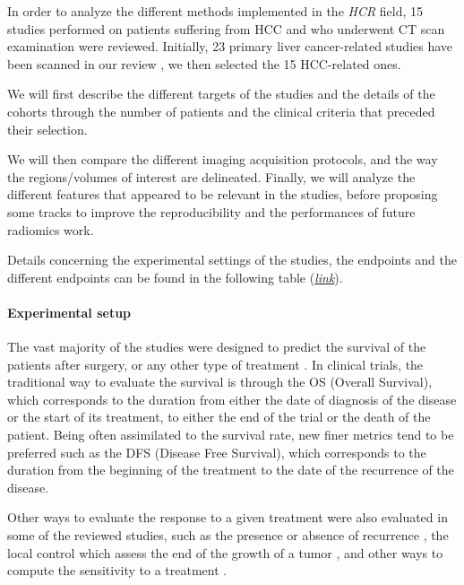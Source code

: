 \documentclass[]{article}
\let\oldparagraph\paragraph
\renewcommand{\paragraph}[1]{\oldparagraph{#1}\mbox{}}
\begin{document}
In order to analyze the different methods implemented in the \emph{HCR}
field, 15 studies performed on patients suffering from HCC and who
underwent CT scan examination were reviewed. Initially, 23 primary liver
cancer-related studies have been scanned in our review \cite{Wakabayashi2019}, we then selected the 15 HCC-related ones.

We will first describe the different targets of the studies and the
details of the cohorts through the number of patients and the clinical
criteria that preceded their selection.

We will then compare the different imaging acquisition protocols, and
the way the regions/volumes of interest are delineated. Finally, we will
analyze the different features that appeared to be relevant in the
studies, before proposing some tracks to improve the reproducibility and
the performances of future radiomics work.

Details concerning the experimental settings of the studies, the
endpoints and the different endpoints can be found in the following
table
(\href{https://docs.google.com/spreadsheets/u/0/d/10EHNALN2_6ZavU7049n6CwTfJO_vd6WBod64u8YNbHg/edit}{\emph{link}}).

\paragraph{Experimental setup}\label{experimental-setup}

The vast majority of the studies were designed to predict the survival
of the patients after surgery, or any other type of treatment \cite{Cozzi2017,Akai2018,Chen2017,Li2016,Banerjee2015,Segal2007,Zheng2018,Xia2018}. In
clinical trials, the traditional way to evaluate the survival is through
the OS (Overall Survival), which corresponds to the duration from either
the date of diagnosis of the disease or the start of its treatment, to
either the end of the trial or the death of the patient. Being often
assimilated to the survival rate, new finer metrics tend to be preferred
such as the DFS (Disease Free Survival), which corresponds to the
duration from the beginning of the treatment to the date of the
recurrence of the disease.

Other ways to evaluate the response to a given treatment were also
evaluated in some of the reviewed studies, such as the presence or
absence of recurrence \cite{Zhou2017a,Zheng2018}, the local control
which assess the end of the growth of a tumor \cite{Cozzi2017},
and other ways to compute the sensitivity to a treatment \cite{Kuo2007,Li2016}.
\end{document}
